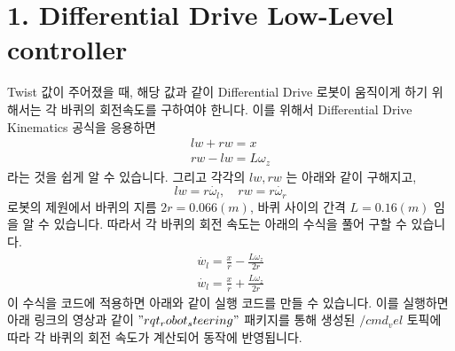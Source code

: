 \documentclass{article}
\begin{document}
\section*{1. Differential Drive Low-Level controller}

Twist 값이 주어졌을 때, 해당 값과 같이 Differential Drive 로봇이 움직이게 하기 위해서는 각 바퀴의 회전속도를 구하여야 한니다. 이를 위해서 Differential Drive Kinematics 공식을 응용하면 
\begin{align*}
lw + rw = x \\
rw - lw = L\omega_{z}
\end{align*}
라는 것을 쉽게 알 수 있습니다. 그리고 각각의 $lw, rw$ 는 아래와 같이 구해지고, $$lw = r \dot{\omega_{l}}, \quad rw = r \dot{\omega_{r}}$$
로봇의 제원에서 바퀴의 지름 $2r = 0.066 (m)$, 바퀴 사이의 간격 $L = 0.16(m)$ 임을 알 수 있습니다. 따라서 각 바퀴의 회전 속도는 아래의 수식을 풀어 구할 수 있습니다.
\begin{align*}
\dot{w_{l}} = \frac{x}{r} - \frac{L\omega_{z}}{2r} \\
\dot{w_{l}} = \frac{x}{r} + \frac{L\omega_{z}}{2r} 
\end{align*}
이 수식을 코드에 적용하면 아래와 같이 실행 코드를 만들 수 있습니다.
이를 실행하면 아래 링크의 영상과 같이 $"rqt_robot_steering"$ 패키지를 통해 생성된 $/cmd_vel$ 토픽에 따라 각 바퀴의 회전 속도가 계산되어 동작에 반영됩니다.
\end{document}
